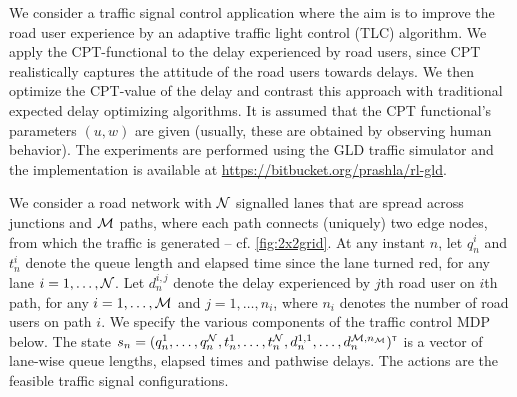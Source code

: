 We consider a traffic signal control application where the aim is to improve the road user experience by an adaptive traffic light control (TLC) algorithm.
We apply the CPT-functional to the delay experienced by road users, since CPT realistically captures the attitude of the road users towards delays. We then optimize the CPT-value of the delay and contrast this approach with traditional expected delay optimizing algorithms. It is assumed that the CPT functional's parameters $(u,w)$ are given (usually, these are obtained by observing human behavior). The experiments are performed using the GLD traffic simulator \cite{GLDSim} and the implementation is available at \url{https://bitbucket.org/prashla/rl-gld}.

We consider a road network with $\mathcal{N}$ signalled lanes that are spread across junctions and $\mathcal{M}$ paths, where each path connects (uniquely) two edge nodes, from which the traffic is generated -- cf. \cref{fig:2x2grid}. 
At any instant $n$, let $q_n^i$ and $t_n^i$ denote the queue length and elapsed time since the lane turned red, for any lane $i = 1,\ldots, \mathcal{N}$. Let $d_n^{i,j}$ denote the delay experienced by $j$th road user on $i$th path, for any $i=1,\ldots,\mathcal{M}$ and $j=1,\ldots,n_i$, where $n_i$ denotes the number of road users on path $i$.
We specify the various components of the traffic control MDP below.
The state $s_n=(q_n^1,\ldots,q_n^{\mathcal{N}},t_n^1,\ldots,t_n^{\mathcal{N}},d_n^{1,1},\ldots,d_n^{\mathcal{M},n_{\mathcal{M}}})^\mathsf{\scriptscriptstyle T}$ is a vector of lane-wise queue lengths, elapsed times and pathwise delays.
The actions are the feasible traffic signal configurations. 


